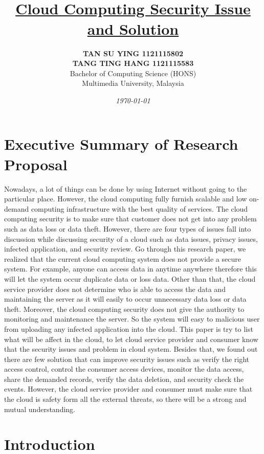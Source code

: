\documentclass[a4paper, 12pt]{article}
\title{
\mbox{} \\
\underline{\bfseries{\Large Cloud Computing Security Issue and Solution}}}
\author{\textbf{{\normalsize TAN SU YING 1121115802}} \vspace{1mm}\\ \textbf{{\normalsize TANG TING HANG 1121115583}} \vspace{3mm}\\ \small{Bachelor of Computing Science (HONS)} \\ \small{Multimedia University, Malaysia}}
\date{}
\begin{document}


\date{\textit{\small{\today}}}
\maketitle

\section{Executive Summary of Research Proposal}

Nowadays, a lot of things can be done by using Internet without going to the particular place. However, the cloud computing fully furnish scalable and low on-demand computing infrastructure with the best quality of services. The cloud computing security is to make sure that customer does not get into any problem such as data loss or data theft. However, there are four types of issues fall into discussion while discussing security of a cloud such as data issues, privacy issues, infected application, and security review. Go through this research paper, we realized that the current cloud computing system does not provide a secure system. For example, anyone can access data in anytime anywhere therefore this will let the system occur duplicate data or loss data. Other than that, the cloud service provider does not determine who is able to access the data and maintaining the server as it will easily to occur unnecessary data loss or data theft. Moreover, the cloud computing security does not give the authority to monitoring and maintenance the server. So the system will easy to malicious user from uploading any infected application into the cloud. This paper is try to list what will be affect in the cloud, to let cloud service provider and consumer know that the security issues and problem in cloud system. Besides that, we found out there are few solution that can improve security issues such as verify the right access control, control the consumer access devices, monitor the data access, share the demanded records, verify the data deletion, and security check the events. However, the cloud service provider and consumer must make sure that the cloud is safety form all the external threats, so there will be a strong and mutual understanding.

\section{Introduction}
\end{document}
